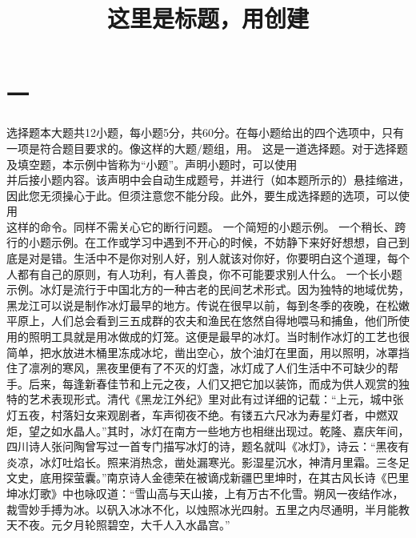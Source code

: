 \documentclass{exammath}
\title{这里是标题，用\fbox{$\backslash$title\{文字\}}创建}
\begin{document}
    \maketitle

    \section{一}{选择题}{本大题共12小题，每小题5分，共60分。在每小题给出的四个选项中，只有一项是符合题目要求的。像这样的大题$\slash$题组，用。}
    \simpleproblem 这是一道选择题。对于选择题及填空题，本示例中皆称为“小题”。声明小题时，可以使用\\并后接小题内容。该声明中会自动生成题号，并进行（如本题所示的）悬挂缩进，因此您无须操心于此。但须注意您不能分段。此外，要生成选择题的选项，可以使用\\这样的命令。同样不需关心它的断行问题。
    \simpleproblem 一个简短的小题示例。
    \simpleproblem 一个稍长、跨行的小题示例。在工作或学习中遇到不开心的时候，不妨静下来好好想想，自己到底是对是错。生活中不是你对别人好，别人就该对你好，你要明白这个道理，每个人都有自己的原则，有人功利，有人善良，你不可能要求别人什么。
    \simpleproblem 一个长小题示例。冰灯是流行于中国北方的一种古老的民间艺术形式。因为独特的地域优势，黑龙江可以说是制作冰灯最早的地方。传说在很早以前，每到冬季的夜晚，在松嫩平原上，人们总会看到三五成群的农夫和渔民在悠然自得地喂马和捕鱼，他们所使用的照明工具就是用冰做成的灯笼。这便是最早的冰灯。当时制作冰灯的工艺也很简单，把水放进木桶里冻成冰坨，凿出空心，放个油灯在里面，用以照明，冰罩挡住了凛冽的寒风，黑夜里便有了不灭的灯盏，冰灯成了人们生活中不可缺少的帮手。后来，每逢新春佳节和上元之夜，人们又把它加以装饰，而成为供人观赏的独特的艺术表现形式。清代《黑龙江外纪》里对此有过详细的记载：“上元，城中张灯五夜，村落妇女来观剧者，车声彻夜不绝。有镂五六尺冰为寿星灯者，中燃双炬，望之如水晶人。”其时，冰灯在南方一些地方也相继出现过。乾隆、嘉庆年间，四川诗人张问陶曾写过一首专门描写冰灯的诗，题名就叫《冰灯》，诗云：“黑夜有炎凉，冰灯吐焰长。照来消热念，凿处漏寒光。影湿星沉水，神清月里霜。三冬足文史，底用探萤囊。”南京诗人金德荣在被谪戍新疆巴里坤时，在其古风长诗《巴里坤冰灯歌》中也咏叹道：“雪山高与天山接，上有万古不化雪。朔风一夜结作冰，裁雪妙手搏为冰。以矾入冰冰不化，以烛照冰光四射。五里之内尽通明，半月能教天不夜。元夕月轮照碧空，大千人入水晶宫。”
\end{document}
